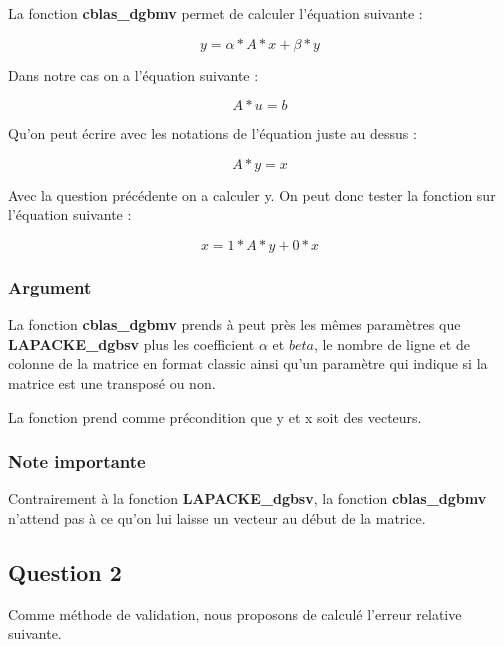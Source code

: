 \documentclass[11pt]{article}
\begin{document}
La fonction \textbf{cblas\_dgbmv} permet de calculer l'équation
suivante :

\begin{equation*}
y = \alpha * A * x + \beta * y
\end{equation*}

Dans notre cas on a l'équation suivante :

\begin{equation*}
A * u = b
\end{equation*}

Qu'on peut écrire avec les notations de l'équation juste au dessus :

\begin{equation*}
A * y = x
\end{equation*}

Avec la question précédente on a calculer y. On peut donc tester la
fonction sur l'équation suivante :

\begin{equation*}
x = 1 * A * y + 0 * x
\end{equation*}

\subsubsection{Argument}

La fonction \textbf{cblas\_dgbmv} prends à peut près les mêmes
paramètres que \textbf{LAPACKE\_dgbsv} plus les coefficient $\alpha$
et $beta$, le nombre de ligne et de colonne de la matrice en format
classic ainsi qu'un paramètre qui indique si la matrice est une
transposé ou non.\newline

La fonction prend comme précondition que y et x soit des vecteurs.

\subsubsection{Note importante}

Contrairement à la fonction \textbf{LAPACKE\_dgbsv}, la fonction
\textbf{cblas\_dgbmv} n'attend pas à ce qu'on lui laisse un vecteur au
début de la matrice.

\subsection{Question 2}

Comme méthode de validation, nous proposons de calculé l'erreur
relative suivante.\newline
\end{document}
